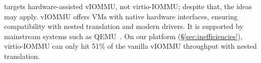 



 \brand targets hardware-assisted vIOMMU, not virtio-IOMMU;
    despite that, the {\name} ideas may apply.
vIOMMU offers VMs with native hardware interfaces, 
    ensuring compatibility with nested translation and modern drivers.
It is supported by mainstream systems such as QEMU~\cite{qemu_10_0}.
On our platform (\S\ref{sec:inefficiencies}),
    virtio-IOMMU can only hit 51\% of the vanilla 
    vIOMMU throughput with nested translation.





    
